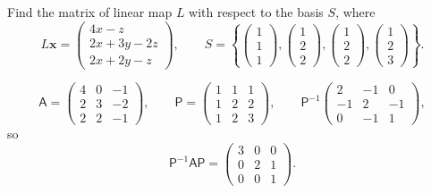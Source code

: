 \documentclass[letter-paper]{tufte-book}
\newenvironment{example}[1][Example]{\begin{trivlist}
\item[\hskip \labelsep {\bfseries #1}]}{\end{trivlist}}
\newcommand{\xb}{\boldsymbol{x}}
\begin{document}
\begin{example}
	Find the matrix of linear map $L$ with respect to the basis $S$, where
	\begin{equation*}
		L\xb=\begin{pmatrix}4x-z\\2x+3y-2z\\2x+2y-z\end{pmatrix},\qquad
		S=\left\{\begin{pmatrix}1\\1\\1\end{pmatrix},
		\begin{pmatrix}1\\2\\2\end{pmatrix},\begin{pmatrix}1\\2\\2\end{pmatrix},
		\begin{pmatrix}1\\2\\3\end{pmatrix}\right\}.
	\end{equation*}	
	
	\begin{equation*}
		\mathsf{A}=\begin{pmatrix}4&0&-1\\2&3&-2\\2&2&-1\end{pmatrix},\qquad
		\mathsf{P}=\begin{pmatrix}1&1&1\\1&2&2\\1&2&3\end{pmatrix},\qquad
		\mathsf{P}^{-1}\begin{pmatrix}2&-1&0\\-1&2&-1\\0&-1&1\end{pmatrix},
	\end{equation*}
	so
	\begin{equation*}
		\mathsf{P}^{-1}\mathsf{A}\mathsf{P}=
		\begin{pmatrix}3&0&0\\0&2&1\\0&0&1\end{pmatrix}.
	\end{equation*}
\end{example}
\end{document}
